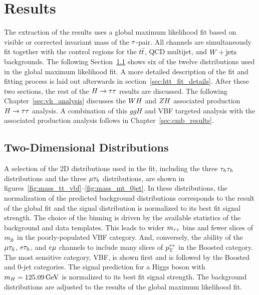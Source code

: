 
\section{Results}
\label{sec:htt_results}

The extraction of the results uses a global maximum likelihood fit based on visible or 
corrected invariant mass of the $\tau$-pair. All 
channels are simultaneously fit together with the control regions for the $t\bar{t}$, QCD multijet, and $W +\text{jets}$ backgrounds. 
The following Section~\ref{sec:htt_2d} shows six of the twelve distributions used in the
global maximum likelihood fit. A more detailed description of the fit and fitting process is 
laid out afterwards in section~\ref{sec:htt_fit_details}. After these two sections,
the rest of the $H\to\tau\tau$ results are discussed.
The following Chapter~\ref{sec:vh_analysis} discusses the $WH$ and $ZH$ associated production $H\to\tau\tau$ analysis.
A combination of this $ggH$ and VBF targeted analysis with the associated production analysis
follows in Chapter~\ref{sec:cmb_results}.


\subsection{Two-Dimensional Distributions}
\label{sec:htt_2d}
A selection of the 2D distributions used in the fit, including the three $\tau_{h}\tau_{h}$ distributions and
the three $\mu\tau_{h}$ distributions, are shown in figures~\ref{fig:mass_tt_vbf}--\ref{fig:mass_mt_0jet}.
In these distributions, the normalization of the predicted background distributions corresponds to the result of the global fit
and the signal distribution is normalized to its best fit signal strength.
The choice of the binning is driven by the available statistics of the background and data templates. This leads to wider 
$m_{\tau\tau}$ bins and fewer slices of $m_\mathrm{jj}$ in the poorly-populated VBF category. And, conversely, the ability of the $\mu\tau_{h}$,
$e\tau_{h}$, and $e\mu$ channels to include many slices of $p_\mathrm{T}^{\tau\tau}$ in the Boosted category. 
The most sensitive category, VBF, is shown first and is followed by the Boosted and 0-jet categories.
The signal prediction for a Higgs boson with $m_{H} = 125.09\,\mathrm{GeV}$ is normalized to its best fit signal strength.
The background distributions are adjusted to the results of the global maximum likelihood fit.

